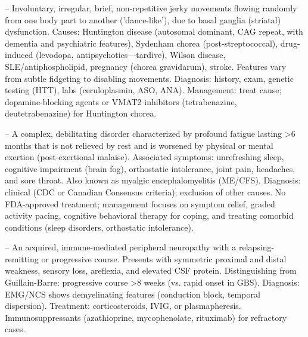 -- Involuntary, irregular, brief, non-repetitive jerky movements flowing randomly from one body part to another ('dance-like'), due to basal ganglia (striatal) dysfunction. Causes: Huntington disease (autosomal dominant, CAG repeat, with dementia and psychiatric features), Sydenham chorea (post-streptococcal), drug-induced (levodopa, antipsychotics—tardive), Wilson disease, SLE/antiphospholipid, pregnancy (chorea gravidarum), stroke. Features vary from subtle fidgeting to disabling movements. Diagnosis: history, exam, genetic testing (HTT), labs (ceruloplasmin, ASO, ANA). Management: treat cause; dopamine-blocking agents or VMAT2 inhibitors (tetrabenazine, deutetrabenazine) for Huntington chorea.

-- A complex, debilitating disorder characterized by profound fatigue lasting >6 months that is not relieved by rest and is worsened by physical or mental exertion (post-exertional malaise). Associated symptoms: unrefreshing sleep, cognitive impairment (brain fog), orthostatic intolerance, joint pain, headaches, and sore throat. Also known as myalgic encephalomyelitis (ME/CFS). Diagnosis: clinical (CDC or Canadian Consensus criteria); exclusion of other causes. No FDA-approved treatment; management focuses on symptom relief, graded activity pacing, cognitive behavioral therapy for coping, and treating comorbid conditions (sleep disorders, orthostatic intolerance).

-- An acquired, immune-mediated peripheral neuropathy with a relapsing-remitting or progressive course. Presents with symmetric proximal and distal weakness, sensory loss, areflexia, and elevated CSF protein. Distinguishing from Guillain-Barre: progressive course >8 weeks (vs. rapid onset in GBS). Diagnosis: EMG/NCS shows demyelinating features (conduction block, temporal dispersion). Treatment: corticosteroids, IVIG, or plasmapheresis. Immunosuppressants (azathioprine, mycophenolate, rituximab) for refractory cases.

